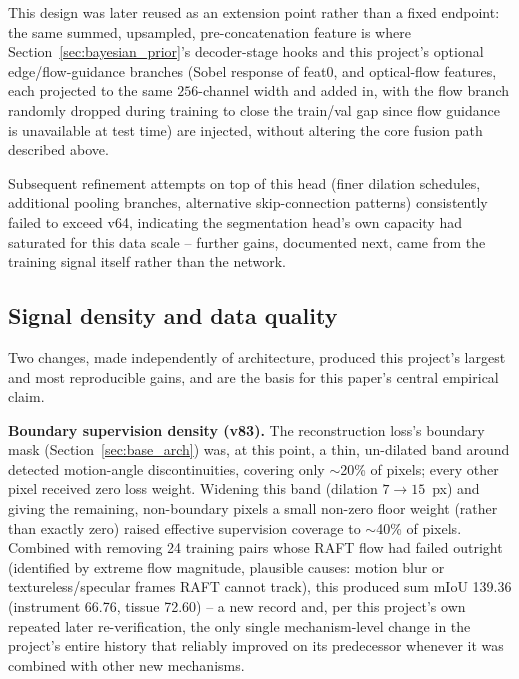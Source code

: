 \documentclass[conference]{IEEEtran}
\begin{document}
This design was later reused as an extension point rather than a fixed
endpoint: the same summed, upsampled, pre-concatenation feature is where
Section~\ref{sec:bayesian_prior}'s decoder-stage hooks and this
project's optional edge/flow-guidance branches (Sobel response of feat0,
and optical-flow features, each projected to the same $256$-channel
width and added in, with the flow branch randomly dropped during
training to close the train/val gap since flow guidance is unavailable
at test time) are injected, without altering the core fusion path
described above.

Subsequent refinement attempts on top of this head (finer dilation
schedules, additional pooling branches, alternative skip-connection
patterns) consistently failed to exceed v64, indicating the segmentation
head's own capacity had saturated for this data scale -- further gains,
documented next, came from the training signal itself rather than the
network.

\subsection{Signal density and data quality}
\label{sec:signal_quality}

Two changes, made independently of architecture, produced this project's
largest and most reproducible gains, and are the basis for this paper's
central empirical claim.

\textbf{Boundary supervision density (v83).} The reconstruction loss's
boundary mask (Section~\ref{sec:base_arch}) was, at this point, a thin,
un-dilated band around detected motion-angle discontinuities, covering
only $\sim$20\% of pixels; every other pixel received zero loss weight.
Widening this band (dilation $7\!\to\!15$~px) and giving the remaining,
non-boundary pixels a small non-zero floor weight (rather than exactly
zero) raised effective supervision coverage to $\sim$40\% of pixels.
Combined with removing 24 training pairs whose RAFT flow had failed
outright (identified by extreme flow magnitude, plausible causes:
motion blur or textureless/specular frames RAFT cannot track), this
produced sum mIoU 139.36 (instrument 66.76, tissue 72.60) -- a new record
and, per this project's own repeated later re-verification, the only
single mechanism-level change in the project's entire history that
reliably improved on its predecessor whenever it was combined with other
new mechanisms.
\end{document}
